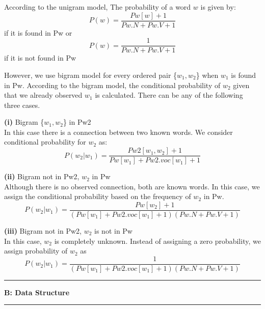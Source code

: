 \documentclass[11pt]{article}
\newcommand\question[2]{\vspace{.25in}\hrule\textbf{#1: #2}\vspace{.5em}\hrule\vspace{.10in}}
\renewcommand\part[1]{\vspace{.10in}\textbf{(#1)}}
\begin{document}
According to the unigram model, The probability of a word $w$ is given by:   
\begin{equation}
P(w)=\frac{Pw[w]+1}{Pw.N+Pw.V+1}
\end{equation}
if it is found in Pw or
\begin{equation}
P(w)=\frac{1}{Pw.N+Pw.V+1}
\end{equation}
if it is not found in Pw

However, we use bigram model for every ordered pair \{$w_1,w_2$\} when $w_1$ is found in Pw. According to the bigram model, the conditional probability of $w_2$ given that we already observed $w_1$ is calculated. There can be any of the following three cases. 

\part{i} Bigram \{$w_1,w_2$\} in Pw2\\
In this case there is a connection between two known words. We consider conditional probability for $w_2$ as:
\begin{equation}
	P(w_2|w_1)=\frac{Pw2[w_1,w_2]+1}{Pw[w_1]+Pw2.voc[w_1]+1}
\end{equation}

\part{ii} Bigram not in Pw2, $w_2$ in Pw\\
Although there is no observed connection, both are known words. In this case, we assign the conditional probability based on the frequency of $w_2$ in Pw. 
\begin{equation}
	P(w_2|w_1)=\frac{Pw[w_2]+1}{(Pw[w_1]+Pw2.voc[w_1]+1)(Pw.N+Pw.V+1)}
\end{equation}

\part{iii} Bigram not in Pw2, $w_2$ is not in Pw\\
In this case, $w_2$ is completely unknown. Instead of assigning a zero probability, we assign probability of $w_2$ as \\
\begin{equation}
P(w_2|w_1)=\frac{1}{(Pw[w_1]+Pw2.voc[w_1]+1)(Pw.N+Pw.V+1)}
\end{equation}

\question{B}{Data Structure}
\end{document}
